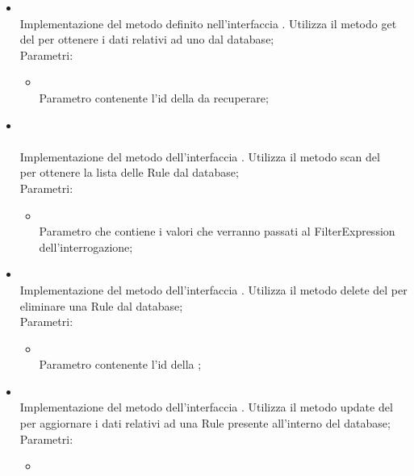 \begin{itemize}
\begin{itemize}
\begin{itemize}
		\end{itemize}
		\item[]  \\		Implementazione del metodo definito nell'interfaccia . Utilizza il metodo get del  per ottenere i dati relativi ad uno  dal database;\\
		Parametri:
		\begin{itemize}
			\item {} \\
			Parametro contenente l'id della  da recuperare;
		\end{itemize}
		\item[]  \\\\		Implementazione del metodo dell'interfaccia . Utilizza il metodo scan del \\  per ottenere la lista delle Rule dal database;\\
		Parametri:
		\begin{itemize}
			\item {} \\
			Parametro che contiene i valori che verranno passati al FilterExpression dell'interrogazione;
		\end{itemize}
		\item[]  \\		Implementazione del metodo dell'interfaccia . Utilizza il metodo delete del  per eliminare una Rule dal database;\\
		Parametri:
		\begin{itemize}
			\item {} \\
			Parametro contenente l'id della ;
		\end{itemize}
		\item[]  \\		Implementazione del metodo dell'interfaccia . Utilizza il metodo update del  per aggiornare i dati relativi ad una Rule presente all'interno del database;\\
		Parametri:
		\begin{itemize}
			\item {} \\

\end{itemize}
\end{itemize}
\end{itemize}
